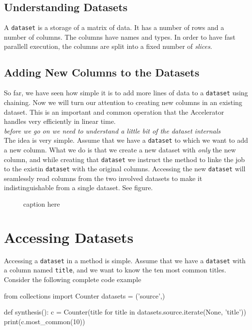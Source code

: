\documentclass[a4paper]{article}
\begin{document}
\subsection{Understanding Datasets}
A \texttt{dataset} is a storage of a matrix of data.  It has a number
of rows and a number of columns.  The columns have names and types.
In order to have fast parallell execution, the columns are split into
a fixed number of \textsl{slices}.



\subsection{Adding New Columns to the Datasets}
So far, we have seen how simple it is to add more lines of data to a
\texttt{dataset} using chaining.  Now we will turn our attention to
creating new columns in an existing dataset.  This is an important and
common operation that the Accelerator handles very efficiently in
linear time.\\
\textsl{before we go on we need to understand a little bit of the dataset internals}\\

The idea is very simple.  Assume that we have a \texttt{dataset} to
which we want to add a new column.  What we do is that we create a new
dataset with \textsl{only} the new column, and while creating that
\texttt{dataset} we instruct the method to linke the job to the
existin \texttt{dataset} with the original columns.  Accessing the new
\texttt{dataset} will seamlessly read columns from the two involved
datasets to make it indistinguishable from a single dataset.  See
figure.



\begin{figure}[h!]
  \begin{center}
    
    \caption{caption here}
    \label{fig:dep_dataset_csvimport_chain}
  \end{center}
\end{figure}








\section{Accessing Datasets}
Accessing a \texttt{dataset} in a method is simple.  Assume that we
have a \texttt{dataset} with a column named \texttt{title}, and we
want to know the ten most common titles.  Consider the following
complete code example
\begin{python}
from collections import Counter
datasets = ('source',)

def synthesis():
    c = Counter(title for title in datasets.source.iterate(None, 'title'))
    print(c.most_common(10))
\end{python}
\end{document}
